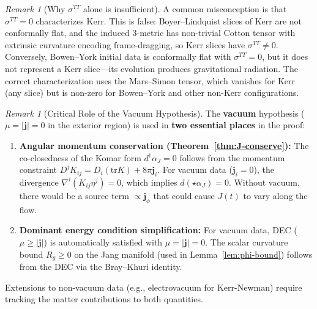\documentclass[12pt]{article}
\theoremstyle{plain}
\theoremstyle{definition}
\theoremstyle{remark}
\newtheorem{remark}[theorem]{Remark}
\newcommand{\tr}{\mathrm{tr}}
\newcommand{\bg}{\bar{g}}
\newcommand{\momdens}{\boldsymbol{j}}
\begin{document}
\begin{remark}[Why $\sigma^{TT}$ alone is insufficient]\label{rem:sigmaTT-insufficient}
A common misconception is that $\sigma^{TT} = 0$ characterizes Kerr. This is false: Boyer--Lindquist slices of Kerr are not conformally flat, and the induced 3-metric has non-trivial Cotton tensor with extrinsic curvature encoding frame-dragging, so Kerr slices have $\sigma^{TT} \neq 0$. Conversely, Bowen--York initial data \cite{bowen1980} is conformally flat with $\sigma^{TT} = 0$, but it does not represent a Kerr slice---its evolution produces gravitational radiation. The correct characterization uses the Mars--Simon tensor, which vanishes for Kerr (any slice) but is non-zero for Bowen--York and other non-Kerr configurations.
\end{remark}

\begin{remark}[Critical Role of the Vacuum Hypothesis]\label{rem:vacuum-critical}
The \textbf{vacuum} hypothesis ($\mu = |\momdens| = 0$ in the exterior region) is used in \textbf{two essential places} in the proof:
\begin{enumerate}
    \item \textbf{Angular momentum conservation (Theorem~\ref{thm:J-conserve}):} The co-closedness of the Komar form $d^\dagger\alpha_J = 0$ follows from the momentum constraint $D^j K_{ij} = D_i(\tr K) + 8\pi \momdens_i$. For vacuum data ($\momdens_i = 0$), the divergence $\nabla^i(K_{ij}\eta^j) = 0$, which implies $d(\star\alpha_J) = 0$. Without vacuum, there would be a source term $\propto \momdens_\phi$ that could cause $J(t)$ to vary along the flow.
    
    \item \textbf{Dominant energy condition simplification:} For vacuum data, DEC ($\mu \geq |\momdens|$) is automatically satisfied with $\mu = |\momdens| = 0$. The scalar curvature bound $R_{\bg} \geq 0$ on the Jang manifold (used in Lemma~\ref{lem:phi-bound}) follows from the DEC via the Bray--Khuri identity.
\end{enumerate}
Extensions to non-vacuum data (e.g., electrovacuum for Kerr-Newman) require tracking the matter contributions to both quantities.


\end{remark}
\end{document}
